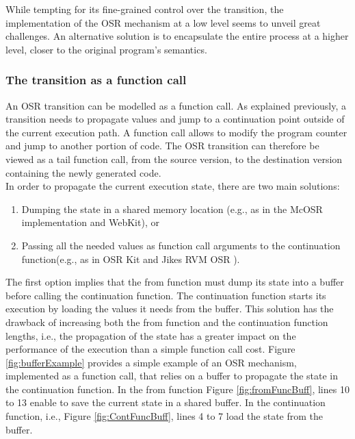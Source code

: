 While tempting for its fine-grained control over the transition, the implementation of the OSR mechanism at a low level seems to unveil great challenges.
An alternative solution is to encapsulate the entire process at a higher level, closer to the original program's semantics.\\

\subsubsection{The transition as a function call}
An OSR transition can be modelled as a function call.
As explained previously, a transition needs to propagate values and jump to a continuation point outside of the current execution path.
A function call allows to modify the program counter and jump to another portion of code.
The OSR transition can therefore be viewed as a tail function call, from the source version, to the destination version containing the newly generated code.\\

In order to propagate the current execution state, there are two main solutions: 
\begin{enumerate}
    \item Dumping the state in a shared memory location (e.g., as in the McOSR implementation\cite{lameed2013modular} and WebKit\cite{WebKitURL}), or
    \item Passing all the needed values as function call arguments to the continuation function(e.g., as in OSR Kit\cite{OSRKit} and Jikes RVM OSR \cite{fink2003design}).
\end{enumerate}

The first option implies that the from function must dump its state into a buffer before calling the continuation function.
The continuation function starts its execution by loading the values it needs from the buffer.
This solution has the drawback of increasing both the from function and the continuation function lengths, i.e., the propagation of the state has a greater impact on the performance of the execution than a simple function call cost.
Figure \ref{fig:bufferExample} provides a simple example of an OSR mechanism, implemented as a function call, that relies on a buffer to propagate the state in the continuation function.
In the from function Figure \ref{fig:fromFuncBuff}, lines 10 to 13 enable to save the current state in a shared buffer.
In the continuation function, i.e., Figure \ref{fig:ContFuncBuff}, lines 4 to 7 load the state from the buffer.\\

